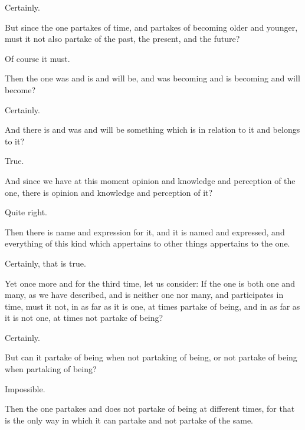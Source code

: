 \documentclass[11pt,letter]{article}
\begin{document}
\par  Certainly.

\par  But since the one partakes of time, and partakes of becoming older and younger, must it not also partake of the past, the present, and the future?

\par  Of course it must.

\par  Then the one was and is and will be, and was becoming and is becoming and will become?

\par  Certainly.

\par  And there is and was and will be something which is in relation to it and belongs to it?

\par  True.

\par  And since we have at this moment opinion and knowledge and perception of the one, there is opinion and knowledge and perception of it?

\par  Quite right.

\par  Then there is name and expression for it, and it is named and expressed, and everything of this kind which appertains to other things appertains to the one.

\par  Certainly, that is true.

\par  Yet once more and for the third time, let us consider: If the one is both one and many, as we have described, and is neither one nor many, and participates in time, must it not, in as far as it is one, at times partake of being, and in as far as it is not one, at times not partake of being?

\par  Certainly.

\par  But can it partake of being when not partaking of being, or not partake of being when partaking of being?

\par  Impossible.

\par  Then the one partakes and does not partake of being at different times, for that is the only way in which it can partake and not partake of the same.
\end{document}
